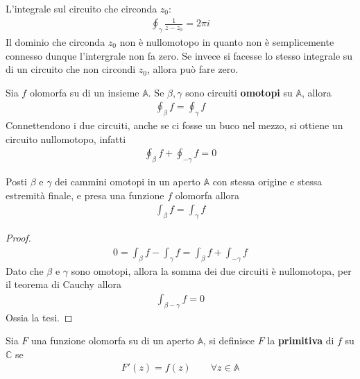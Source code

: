 \documentclass[a4paper, oneside]{article}
\begin{document}
\begin{example}
    L'integrale sul circuito che circonda $z_0$:
    \begin{gather*}
        \oint_\gamma \frac{1}{z - z_0} = 2\pi i
    \end{gather*}
    Il dominio che circonda $z_0$ non è nullomotopo in quanto 
    non è semplicemente connesso dunque l'intergrale non fa zero. Se invece
    si facesse lo stesso integrale su di un circuito che non circondi $z_0$, allora può fare zero. 
\end{example}

\begin{theorem}
    Sia $f$ olomorfa su di un insieme $\mathbb{A}$. Se $\beta, \gamma$ sono circuiti 
    \textbf{omotopi} su $\mathbb{A}$, allora 
    \begin{align}
        \oint_{\beta} f = \oint_\gamma  f
    \end{align}
    Connettendono i due circuiti, anche se ci fosse un buco nel mezzo, si ottiene un circuito nullomotopo, infatti
    \begin{align}
        \oint_\beta f +\oint_{-\gamma}f = 0
    \end{align}
\end{theorem}

\begin{theorem}
    Posti $\beta$ e $\gamma$ dei cammini omotopi in un aperto $\mathbb{A}$ con 
    stessa origine e stessa estremità finale, e presa una funzione
    $f$ olomorfa allora 
    \begin{align}
        \int_{\beta} f = \int_{\gamma} f  
    \end{align}
\end{theorem}
\begin{proof}
    \begin{gather*}
        0 = \int_{\beta}^{} f - \int_{\gamma}^{} f = \int_{\beta}^{} f + \int_{-\gamma}^{}   f
    \end{gather*}
    Dato che $\beta$ e $\gamma$ sono omotopi, allora la somma dei due circuiti è nullomotopa, 
    per il teorema di Cauchy allora 
    \begin{gather*}
        \int_{\beta - \gamma}^{} f = 0 
    \end{gather*}
    Ossia la tesi. 
\end{proof}

\begin{definition}
    Sia $F$ una funzione olomorfa su di un aperto $\mathbb{A}$, si definisce 
    $F$ la \textbf{primitiva} di $f$ su $\mathbb{C}$ se
    \begin{align}
        F'(z) = f(z) \qquad \forall z \in \mathbb{A}
    \end{align}
\end{definition}
\end{document}
